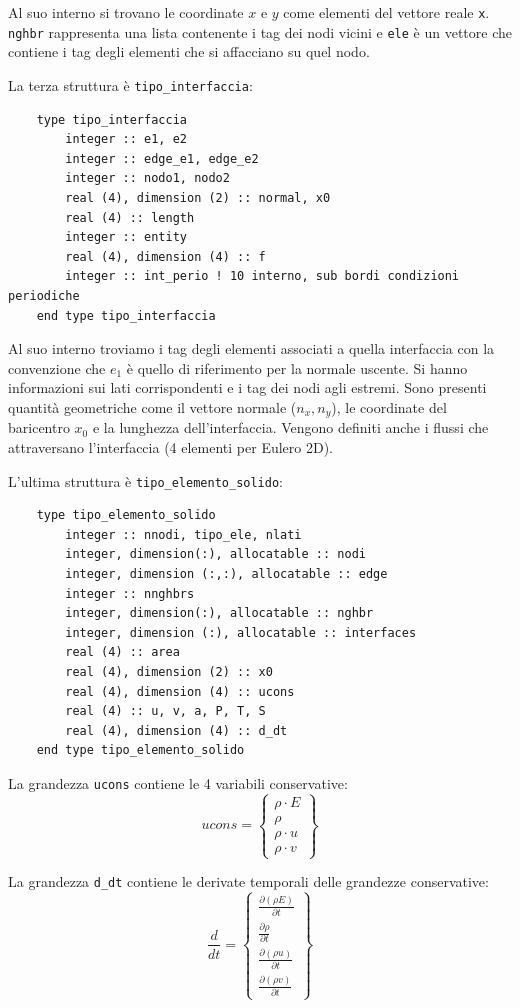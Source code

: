 Al suo interno si trovano le coordinate $x$ e $y$ come elementi del vettore reale \texttt{x}. \texttt{nghbr} rappresenta una lista contenente i tag dei nodi vicini e \texttt{ele} è un vettore che contiene i tag degli elementi che si affacciano su quel nodo.

La terza struttura è \texttt{tipo\_interfaccia}:

\begin{lstlisting}
    type tipo_interfaccia
        integer :: e1, e2
        integer :: edge_e1, edge_e2
        integer :: nodo1, nodo2
        real (4), dimension (2) :: normal, x0
        real (4) :: length
        integer :: entity
        real (4), dimension (4) :: f
        integer :: int_perio ! 10 interno, sub bordi condizioni periodiche
    end type tipo_interfaccia
\end{lstlisting}

Al suo interno troviamo i tag degli elementi associati a quella interfaccia con la convenzione che $e_1$ è quello di riferimento per la normale uscente. Si hanno informazioni sui lati corrispondenti e i tag dei nodi agli estremi. Sono presenti quantità geometriche come il vettore normale ($n_x, n_y$), le coordinate del baricentro $x_0$ e la lunghezza dell'interfaccia. Vengono definiti anche i flussi che attraversano l'interfaccia (4 elementi per Eulero 2D).

L'ultima struttura è \texttt{tipo\_elemento\_solido}:

\begin{lstlisting}
    type tipo_elemento_solido
        integer :: nnodi, tipo_ele, nlati
        integer, dimension(:), allocatable :: nodi
        integer, dimension (:,:), allocatable :: edge
        integer :: nnghbrs
        integer, dimension(:), allocatable :: nghbr
        integer, dimension (:), allocatable :: interfaces
        real (4) :: area
        real (4), dimension (2) :: x0
        real (4), dimension (4) :: ucons
        real (4) :: u, v, a, P, T, S
        real (4), dimension (4) :: d_dt
    end type tipo_elemento_solido
\end{lstlisting}

La grandezza \texttt{ucons} contiene le 4 variabili conservative:
\[
ucons = \begin{Bmatrix} \rho \cdot E \\ \rho \\ \rho \cdot u \\ \rho \cdot v \end{Bmatrix}
\]

La grandezza \texttt{d\_dt} contiene le derivate temporali delle grandezze conservative:
\[
\frac{d}{dt} = \begin{Bmatrix} \frac{\partial (\rho E)}{\partial t} \\ \frac{\partial \rho}{\partial t} \\ \frac{\partial (\rho u)}{\partial t} \\ \frac{\partial (\rho v)}{\partial t} \end{Bmatrix}
\]

